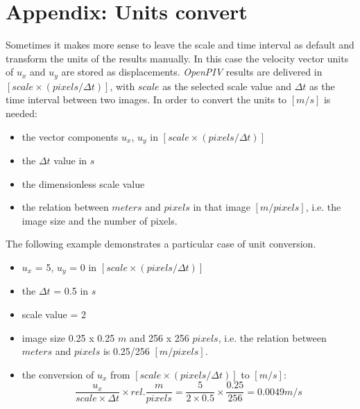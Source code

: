 \clearpage
\appendix
\section*{Appendix: Units convert}\label{Units}

Sometimes it makes more sense to leave the scale and time interval as default and transform the units of the results manually. In this case the velocity vector units of $u_{x}$ and $u_{y}$ are stored as displacements. \emph{OpenPIV} results are delivered in $[scale\times(pixels/\Delta t)]$, 
with $scale$ as the selected scale value and $\Delta t$ as the time interval between two images. 
In order to convert the units to $[m/s]$ is needed:

\begin{itemize}
      	\item the vector components $u_{x}$, $u_{y}$ in $[scale\times(pixels/\Delta t)]$
      	\item the $\Delta t$ value in $s$
      	\item the dimensionless scale value
	\item the relation between $meters$ and $pixels$ in that image $[m/pixels]$, i.e. the 
	      image size and the number of pixels.
\end{itemize}

The following example demonstrates a particular case of unit conversion.

\begin{itemize}
      	\item $u_{x}$ = 5, $u_{y}$ = 0 in $[scale\times(pixels/\Delta t)]$
      	\item the $\Delta t$ = 0.5 in $s$
      	\item scale value = 2
        \item image size 0.25 x 0.25 $m$ and 256 x 256 $pixels$, i.e. the relation between 
	      $meters$ and $pixels$ is 0.25/256 $[m/pixels]$.
    	\item the conversion of $u_{x}$ from $[scale\times(pixels/\Delta t)]$ to $[m/s]$:
        \[
         \frac{u_{x}}{scale\times\Delta t}\times rel.\frac{m}{pixels}=\frac{5}{2\times0.5}\times 
         \frac{0.25}{256}=0.0049 m/s
        \]
\end{itemize}
